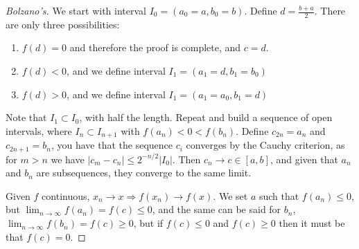 \documentclass[aspectratio=169]{beamer}
\begin{document}
\begin{frame}
    \begin{proof}[Bolzano's]
        We start with interval $I_0=(a_0=a,b_0=b)$. Define $d=\frac{b+a}{2}$. There are only three possibilities:
        \begin{enumerate}
            \item $f(d)=0$ and therefore the proof is complete, and $c=d$.
            \item $f(d)<0$, and we define interval $I_1 = (a_1 = d , b_1 = b_0)$
            \item $f(d)>0$, and we define interval $I_1 = (a_1 = a_0 , b_1 = d)$
        \end{enumerate}
        Note that $I_1\subset I_0$, with half the length. Repeat and build a sequence of open intervals, where $I_n\subset I_{n+1}$ with $f(a_n)<0<f(b_n)$.
        Define $c_{2n}=a_n$ and $c_{2n+1}=b_n$, you have that the sequence $c_i$ converges by the Cauchy criterion, as for $m>n$ we have $|c_m-c_n|\leq 2^{-n/2}|I_0|$.
        Then $c_n\rightarrow c\in[a,b]$, and given that $a_n$ and $b_n$ are subsequences, they converge to the same limit.

        Given $f$ continuous, $x_n\rightarrow x \Rightarrow f(x_n)\rightarrow f(x)$.
        We set $a$ such that $f(a_n)\leq 0$, but $\lim_{n\rightarrow \infty} f(a_n)=f(c)\leq 0$, and the same can be said for $b_n$, $\lim_{n\rightarrow\infty}f(b_n)=f(c)\geq 0$, but if
        $f(c)\leq0$ and $f(c)\geq 0$ then it must be that $f(c)=0$.
    \end{proof}
\end{frame}


\begin{frame}
    \begin{center}
        \begin{figure}
            \centering
        \end{figure}
    \end{center}
\end{frame}
\end{document}
